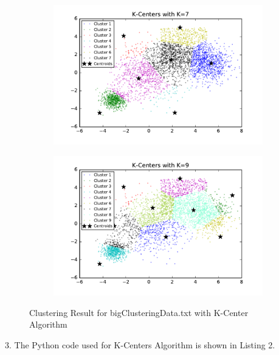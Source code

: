 \begin{description}
\begin{description}
\begin{figure}[!h]
        \begin{subfigure}[b]{0.475\textwidth}   
            \centering 
            \includegraphics[width=\textwidth]{./figures/bigClustering_kCenter_7.pdf}
        \end{subfigure}
        \hfill
        \begin{subfigure}[b]{0.475\textwidth}   
            \centering 
            \includegraphics[width=\textwidth]{./figures/bigClustering_kCenter_9.pdf}
        \end{subfigure}
        
        \caption{Clustering Result for bigClusteringData.txt with K-Center Algorithm}
        \label{fig:kcenter_bigClustering}
\end{figure}

\newpage
\item{3.} The Python code used for K-Centers Algorithm is shown in Listing 2.


\end{description}
\end{description}
